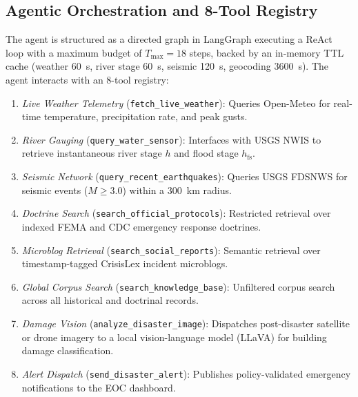 \documentclass[conference]{IEEEtran}
\begin{document}
\subsection{Agentic Orchestration and 8-Tool Registry}
The agent is structured as a directed graph in LangGraph \cite{langgraph} executing a ReAct loop \cite{react} with a maximum budget of $T_{\max} = 18$ steps, backed by an in-memory TTL cache (weather 60~s, river stage 60~s, seismic 120~s, geocoding 3600~s). The agent interacts with an 8-tool registry:
\begin{enumerate}
    \item \textit{Live Weather Telemetry} (\texttt{fetch\_live\_weather}): Queries Open-Meteo for real-time temperature, precipitation rate, and peak gusts.
    \item \textit{River Gauging} (\texttt{query\_water\_sensor}): Interfaces with USGS NWIS to retrieve instantaneous river stage $h$ and flood stage $h_{\mathrm{fs}}$.
    \item \textit{Seismic Network} (\texttt{query\_recent\_earthquakes}): Queries USGS FDSNWS for seismic events ($M \ge 3.0$) within a 300~km radius.
    \item \textit{Doctrine Search} (\texttt{search\_official\_protocols}): Restricted retrieval over indexed FEMA and CDC emergency response doctrines.
    \item \textit{Microblog Retrieval} (\texttt{search\_social\_reports}): Semantic retrieval over timestamp-tagged CrisisLex incident microblogs.
    \item \textit{Global Corpus Search} (\texttt{search\_knowledge\_base}): Unfiltered corpus search across all historical and doctrinal records.
    \item \textit{Damage Vision} (\texttt{analyze\_}\allowbreak\texttt{disaster\_}\allowbreak\texttt{image}): Dispatches post-disaster satellite or drone imagery to a local vision-language model (LLaVA) \cite{llava} for building damage classification.
    \item \textit{Alert Dispatch} (\texttt{send\_disaster\_alert}): Publishes policy-validated emergency notifications to the EOC dashboard.
\end{enumerate}
\end{document}
